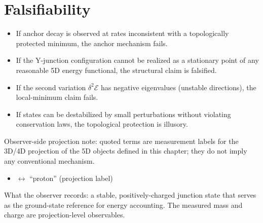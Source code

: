 \section{Falsifiability}
\label{sec:anchor:falsify}

\begin{edcopenbox}[title=Falsifiability Hooks]
    \begin{itemize}
        \item If anchor decay is observed at rates inconsistent with a topologically
              protected minimum, the anchor mechanism fails.
        \item If the Y-junction configuration cannot be realized as a stationary
              point of any reasonable 5D energy functional, the structural claim
              is falsified.
        \item If the second variation $\delta^2\mathcal{E}$ has negative eigenvalues
              (unstable directions), the local-minimum claim fails.
        \item If \Junction{} states can be destabilized by small perturbations without
              violating conservation laws, the topological protection is illusory.
    \end{itemize}
\end{edcopenbox}


\begin{observerbox}
Observer-side projection note: quoted terms are measurement labels for the
3D/4D projection of the 5D objects defined in this chapter; they do not
imply any conventional mechanism.

\begin{itemize}
    \item \AnchorJunction{} $\leftrightarrow$ ``proton'' (projection label)
\end{itemize}

What the observer records: a stable, positively-charged junction state that
serves as the ground-state reference for energy accounting. The measured
mass and charge are projection-level observables.
\end{observerbox}

